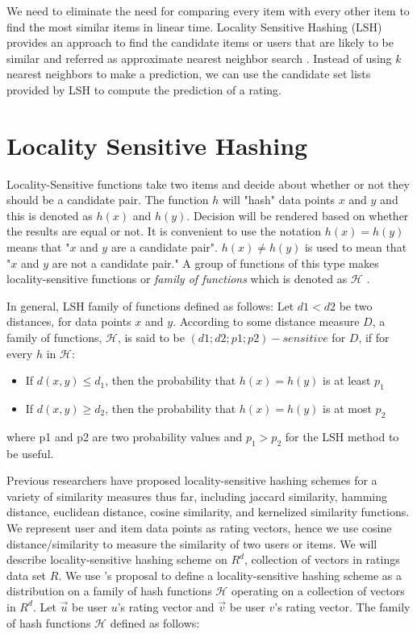 \documentclass[conference]{IEEEtran}
\begin{document}
We need to eliminate the need for comparing every item with  every other item 
to find the most similar items in linear time. Locality Sensitive Hashing (LSH) 
provides an approach to find the candidate items or users that are likely to be similar 
and referred as approximate nearest neighbor search \cite{Rajaraman:2011:MMD:2124405}.
Instead of using $k$ nearest neighbors to make a prediction, we can use the candidate 
set lists provided by LSH to compute the prediction of a rating. 
 
\section{Locality Sensitive Hashing}
\label{sec:lsh}

Locality-Sensitive functions take two items and decide about whether or not
they should be a candidate pair. The function $h$ will "hash" data points $x$
and $y$ and this is denoted as $h(x)$ and $h(y)$. Decision will be rendered 
based on whether the results are equal or not. It is convenient to use the 
notation $h(x) = h(y)$ means that "$x$ and $y$ are a candidate pair". 
$h(x) \neq h(y)$ is used to mean that "$x$ and $y$ are not a candidate pair." 
A group of functions of this type makes locality-sensitive functions or 
\textit{family of functions} which is denoted as $\mathcal{H}$ 
\cite[p.~86]{Rajaraman:2011:MMD:2124405}.

In general, LSH family of functions defined as follows: Let $d1 < d2$ be two
distances, for data points $x$ and $y$. According to some distance measure $D$,
a family of functions, $\mathcal{H}$, is said to be $(d1; d2; p1; p2)-sensitive$ 
for $D$, if for every $h$ in $\mathcal{H}$:

\begin{itemize}
\item If $d(x, y) \leq d_1$, then the probability that $h(x) = h(y)$ is at least $p_1$
\item If $d(x, y) \geq d_2$, then the probability that $h(x) = h(y)$ is at most $p_2$
\end{itemize}

where p1 and p2 are two probability values and $p_1 > p_2$ for the LSH method
to be useful.

Previous researchers have proposed locality-sensitive hashing schemes for a
variety of similarity measures thus far, including jaccard similarity, hamming
distance, euclidean distance, cosine similarity, and kernelized similarity 
functions.
We represent user and item data points as rating vectors, hence
we use cosine distance/similarity to measure the similarity of two users or
items. We will describe locality-sensitive hashing scheme on $R^d$, collection 
of vectors in ratings data set $R$. We use \cite{DBLP:conf/stoc/Charikar02}'s 
proposal  to define a locality-sensitive hashing scheme 
as a distribution on a family of hash functions $\mathcal{H}$ operating on a 
collection of vectors in $R^d$. Let $\vec{u}$ be user $u$'s rating vector and 
$\vec{v}$ be user $v$'s rating vector. The family of hash functions 
$\mathcal{H}$ defined as follows:
\end{document}

